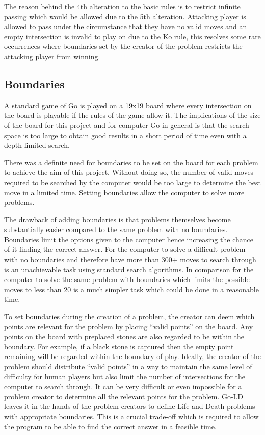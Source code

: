 \documentclass{l4proj}
\begin{document}
\bigskip
The reason behind the 4th alteration to the basic rules is to restrict infinite passing which would be allowed due to the 5th alteration. Attacking player is allowed to pass under the circumstance that they have no valid moves and an empty intersection is invalid to play on due to the Ko rule, this resolves some rare occurrences where boundaries set by the creator of the problem restricts the attacking player from winning.

\subsection{Boundaries}
A standard game of Go is played on a 19x19 board where every intersection on the board is playable if the rules of the game allow it. The implications of the size of the board for this project and for computer Go in general is that the search space is too large to obtain good results in a short period of time even with a depth limited search.

There was a definite need for boundaries to be set on the board for each problem to achieve the aim of this project. Without doing so, the number of valid moves required to be searched by the computer would be too large to determine the best move in a limited time. Setting boundaries allow the computer to solve more problems.

The drawback of adding boundaries is that problems themselves become substantially easier compared to the same problem with no boundaries. Boundaries limit the options given to the computer hence increasing the chance of it finding the correct answer. For the computer to solve a difficult problem with no boundaries and therefore have more than 300+ moves to search through is an unachievable task using standard search algorithms. In comparison for the computer to solve the same problem with boundaries which limits the possible moves to less than 20 is a much simpler task which could be done in a reasonable time.

To set boundaries during the creation of a problem, the creator can deem which points are relevant for the problem by placing “valid points” on the board. Any points on the board with preplaced stones are also regarded to be within the boundary. For example, if a black stone is captured then the empty point remaining will be regarded within the boundary of play. Ideally, the creator of the problem should distribute “valid points” in a way to maintain the same level of difficulty for human players but also limit the number of intersections for the computer to search through. It can be very difficult or even impossible for a problem creator to determine all the relevant points for the problem. Go-LD leaves it in the hands of the problem creators to define Life and Death problems with appropriate boundaries. This is a crucial trade-off which is required to allow the program to be able to find the correct answer in a feasible time.
\end{document}

